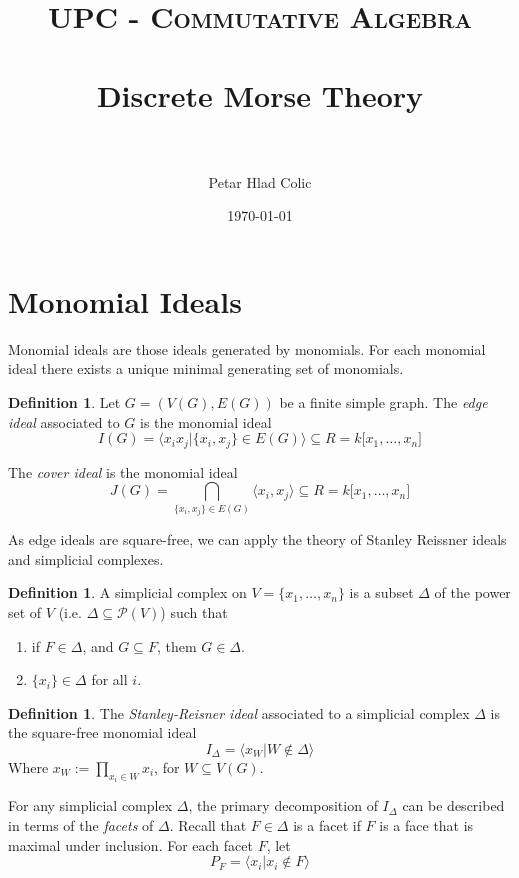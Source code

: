 \documentclass[paper=a4, fontsize=11pt]{scrartcl} %
\title{
\normalfont \normalsize
\textsc{UPC - Commutative Algebra} \\ [25pt] %
\horrule{0.5pt} \\[0.4cm] %
\huge Discrete Morse Theory \\ %
\horrule{2pt} \\[0.5cm] %
}
\author{Petar Hlad Colic} %
\date{\normalsize\today} %
\theoremstyle{plain}
\theoremstyle{definition}
\newtheorem{defn}[thm]{Definition}
\begin{document}
\maketitle %


\section{Monomial Ideals}
Monomial ideals are those ideals generated by monomials. For each monomial ideal there exists a unique minimal generating set of monomials.

\begin{defn}
Let $G = (V(G),E(G))$ be a finite simple graph. The \textit{edge ideal} associated to $G$ is the monomial ideal
$$ I(G) = \langle x_i x_j \vert \lbrace	x_i, x_j \rbrace \in E(G) \rangle \subseteq R = k \lbrack x_1, \dots, x_n \rbrack$$

The \textit{cover ideal} is the monomial ideal
$$J(G) = \bigcap_{\lbrace	x_i, x_j \rbrace \in E(G)}  \langle x_i, x_j \rangle \subseteq R = k \lbrack x_1, \dots, x_n \rbrack$$

\end{defn}

As edge ideals are square-free, we can apply the theory of Stanley Reissner ideals and simplicial complexes. \cite{Mo12}

\begin{defn}
A simplicial complex on $V = \lbrace x_1, \dots , x_n \rbrace$ is a subset $\Delta$ of the power set of $V$ (i.e. $\Delta \subseteq \mathcal{P}(V)$) such that
\renewcommand{\labelenumi}{(\roman{enumi})}
\begin{enumerate}
\item if $F \in \Delta$, and $G\subseteq F$, them $G \in \Delta$.
\item $\lbrace x_i \rbrace \in \Delta$ for all $i$.
\end{enumerate}
\end{defn}

\begin{defn}
The \textit{Stanley-Reisner ideal} associated to a simplicial complex $\Delta$ is the square-free monomial ideal $$I_{\Delta} = \langle x_{W} \vert W \notin \Delta \rangle$$
Where $x_{W} := \prod_{x_i \in W} x_i$, for $W \subseteq V(G)$.
\end{defn}

For any simplicial complex $\Delta$, the primary decomposition of $I_{\Delta}$ can be described in terms of the \textit{facets} of $\Delta$. Recall that $F \in \Delta$ is a facet if $F$ is a face that is maximal under inclusion. For each facet $F$, let $$P_{F} = \langle x_i \vert x_i \notin F \rangle$$
\end{document}
